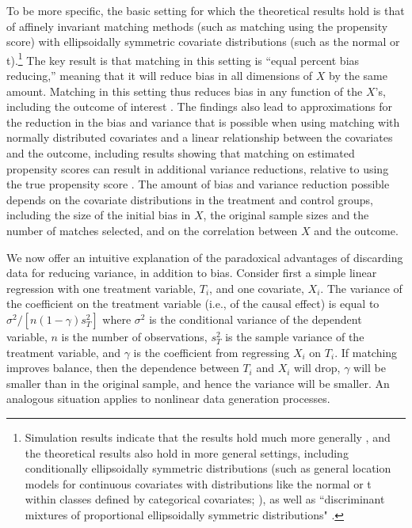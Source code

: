 \documentclass[11pt,titlepage]{article}
\begin{document}
To be more specific, the basic setting for which the theoretical
results hold is that of affinely invariant matching methods (such as
matching using the propensity score) with ellipsoidally symmetric
covariate distributions (such as the normal or t).\footnote{Simulation
  results indicate that the results hold much more generally
  \cite{RubTho96}, and the theoretical results also hold in more
  general settings, including conditionally ellipsoidally symmetric
  distributions (such as general location models for continuous
  covariates with distributions like the normal or t within classes
  defined by categorical covariates; \cite{RubTho96}), as well as
  ``discriminant mixtures of proportional ellipsoidally symmetric
  distributions" \citep{RubStu06}.}  The key result is that matching
in this setting is ``equal percent bias reducing,'' meaning that it
will reduce bias in all dimensions of $X$ by the same amount.
Matching in this setting thus reduces bias in any function of the
$X$'s, including the outcome of interest \citep{RubTho92}.  The
findings also lead to approximations for the reduction in the bias and
variance that is possible when using matching with normally
distributed covariates and a linear relationship between the
covariates and the outcome, including results showing that matching on
estimated propensity scores can result in additional variance
reductions, relative to using the true propensity score
\citep{RubTho96}.  The amount of bias and variance reduction possible
depends on the covariate distributions in the treatment and control
groups, including the size of the initial bias in $X$, the original
sample sizes and the number of matches selected, and on the
correlation between $X$ and the outcome.

We now offer an intuitive explanation of the paradoxical advantages of
discarding data for reducing variance, in addition to bias.  Consider
first a simple linear regression with one treatment variable, $T_i$,
and one covariate, $X_i$.  The variance of the coefficient on the
treatment variable (i.e., of the causal effect) is equal to
$\sigma^2/[n (1-\gamma) s^2_T]$ where $\sigma^2$ is the conditional
variance of the dependent variable, $n$ is the number of observations,
$s^2_T$ is the sample variance of the treatment variable, and $\gamma$
is the coefficient from regressing $X_i$ on $T_i$.  If matching
improves balance, then the dependence between $T_i$ and $X_i$ will
drop, $\gamma$ will be smaller than in the original sample, and hence
the variance will be smaller.  An analogous situation applies to
nonlinear data generation processes.
\end{document}
